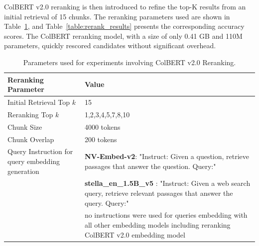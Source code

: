 \documentclass[pdflatex,sn-mathphys-num]{sn-jnl}%
\theoremstyle{thmstyleone}%
\theoremstyle{thmstyletwo}%
\theoremstyle{thmstylethree}%
\begin{document}
ColBERT v2.0 reranking is then introduced to refine the top-K results from an initial retrieval of 15 chunks. The reranking parameters used are shown in Table~\ref{table:rerank_params}, and Table~\ref{table:rerank_results} presents the corresponding accuracy scores. The ColBERT reranking model, with a size of only 0.41 GB and 110M parameters, quickly rescored candidates without significant overhead.

\begin{table}[h]
\centering
\begin{tabular}{|p{4cm}|p{8cm}|}
\hline
\textbf{Reranking Parameter} & \textbf{Value} \\
\hline
Initial Retrieval Top $k$ & 15 \\
Reranking Top $k$ & 1,2,3,4,5,7,8,10 \\
Chunk Size & 4000 tokens \\
Chunk Overlap & 200 tokens \\
Query Instruction for query embedding generation & \textbf{NV-Embed-v2}: "Instruct: Given a question, retrieve passages that answer the question. Query:" \\ 
~ & \textbf{stella\_en\_1.5B\_v5 }: "Instruct: Given a web search query, retrieve relevant passages that answer the query. Query:" \\
~ & no instructions were used for queries embedding with all other embedding models including reranking ColBERT v2.0 embedding model \\
\hline
\end{tabular}
\caption{Parameters used for experiments involving ColBERT v2.0 Reranking.}
\label{table:rerank_params}
\end{table}
\end{document}
